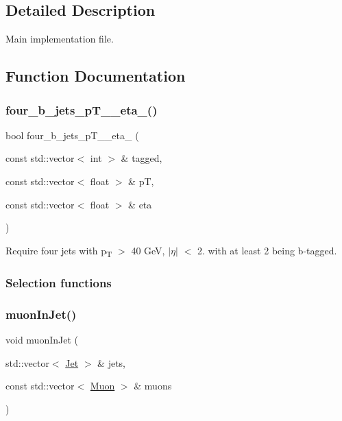 \subsection{Detailed Description}
Main implementation file. 



\subsection{Function Documentation}
\mbox{\label{resolved-recon_8cpp_a1006dab11d2d2a4a97a19cc9a1097e57}} 
\subsubsection{\texorpdfstring{four\+\_\+b\+\_\+jets\+\_\+p\+T\+\_\+\_\+eta\+\_()}{four\_b\_jets\_pT\_40\_eta\_25()}}
{\footnotesize\ttfamily bool four\+\_\+b\+\_\+jets\+\_\+p\+T\+\_\+\_\+eta\+\_ (\begin{DoxyParamCaption}\item[{const std\+::vector$<$ int $>$ \&}]{tagged,  }\item[{const std\+::vector$<$ float $>$ \&}]{pT,  }\item[{const std\+::vector$<$ float $>$ \&}]{eta }\end{DoxyParamCaption})}



Require four jets with p\textsubscript{T} $>$ 40 GeV, $\vert${$\eta$}$\vert$ $<$ 2. with at least 2 being b-\/tagged. 

\subsubsection*{Selection functions}\mbox{\label{resolved-recon_8cpp_ad3c5fdef0ce29848bc5a8940edac0b57}} 
\subsubsection{\texorpdfstring{muon\+In\+Jet()}{muonInJet()}}
{\footnotesize\ttfamily void muon\+In\+Jet (\begin{DoxyParamCaption}\item[{std\+::vector$<$ \mbox{\hyperlink{classJet}{Jet}} $>$ \&}]{jets,  }\item[{const std\+::vector$<$ \mbox{\hyperlink{classMuon}{Muon}} $>$ \&}]{muons }\end{DoxyParamCaption})}



